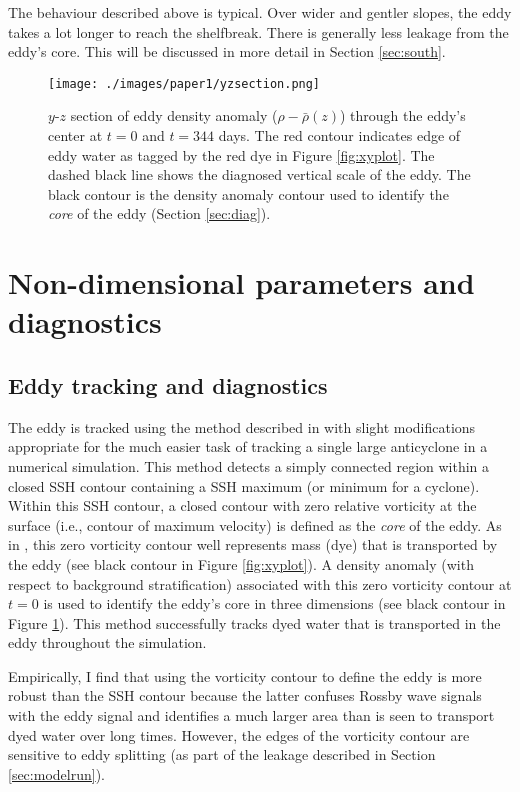 The behaviour described above is typical. Over wider and gentler slopes, the eddy takes a lot longer to reach the shelfbreak. There is generally less leakage from the eddy's core. This will be discussed in more detail in Section \ref{sec:south}.

\begin{figure}[htb]
\centering
\texttt{[image: ./images/paper1/yzsection.png]}
\caption{\label{fig:yzplot}$y$-$z$ section of eddy density anomaly ($ρ - \bar{ρ}(z)$) through the eddy's center at $t=0$ and $t=344$ days. The red contour indicates edge of eddy water as tagged by the red dye in Figure \ref{fig:xyplot}. The dashed black line shows the diagnosed vertical scale of the eddy. The black contour is the density anomaly contour used to identify the \emph{core} of the eddy (Section \ref{sec:diag}).}
\end{figure}
\section{Non-dimensional parameters and diagnostics}
\label{sec-4}
\subsection{Eddy tracking and diagnostics}
\label{sec-4-1}
\label{sec:diag}
The eddy is tracked using the method described in \citet{Chelton2011} with slight modifications appropriate for the much easier task of tracking a single large anticyclone in a numerical simulation. This method detects a simply connected region within a closed SSH contour containing a SSH maximum (or minimum for a cyclone). Within this SSH contour, a closed contour with zero relative vorticity at the surface (i.e., contour of maximum velocity) is defined as the \emph{core} of the  eddy. As in \citet{Early2011}, this zero vorticity contour well represents mass (dye) that is transported by the eddy (see black contour in Figure \ref{fig:xyplot}). A density anomaly (with respect to background stratification) associated with this zero vorticity contour at $t=0$ is used to identify the eddy's core in three dimensions (see black contour in Figure \ref{fig:yzplot}). This method successfully tracks dyed water that is transported in the eddy throughout the simulation.

Empirically, I find that using the vorticity contour to define the eddy is more robust than the SSH contour because the latter confuses Rossby wave signals with the eddy signal and identifies a much larger area than is seen to transport dyed water over long times. However, the edges of the vorticity contour are sensitive to eddy splitting (as part of the leakage described in Section \ref{sec:modelrun}).

